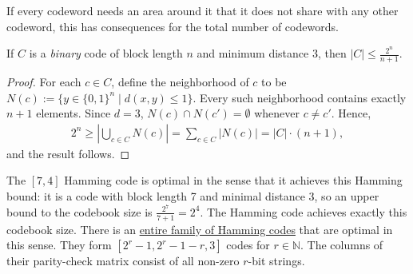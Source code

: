 \begin{center}
\def\scale{0.75}
\end{center}
If every codeword needs an area around it that it does not share with any other codeword, this has consequences for the total number of codewords.
\begin{proposition}
If $C$ is a \emph{binary} code of block length $n$ and minimum distance 3, then $|C| \leq \frac{2^n}{n+1}$.
\end{proposition}
\begin{proof}
For each $c \in C$, define the neighborhood of $c$ to be $N(c) := \{y \in \{0,1\}^n \mid d(x,y) \leq 1\}$. Every such neighborhood contains exactly $n+1$ elements. Since $d = 3$, $N(c) \cap N(c') = \emptyset$ whenever $c \neq c'$. Hence,
\begin{align}
2^n \geq |\bigcup_{c \in C} N(c)| = \sum_{c \in C} |N(c)| = |C| \cdot (n+1),
\end{align}
and the result follows.
\end{proof}
The $[7,4]$ Hamming code is optimal in the sense that it achieves this Hamming bound: it is a code with block length 7 and minimal distance 3, so an upper bound to the codebook size is $\frac{2^7}{7+1} = 2^4$. The Hamming code achieves exactly this codebook size. There is an \href{https://en.wikipedia.org/wiki/Hamming_code}{entire family of Hamming codes} that are optimal in this sense. They form $[2^r-1,2^r-1-r,3]$ codes for $r \in \mathbb{N}$. The columns of their parity-check matrix consist of all non-zero $r$-bit strings.

